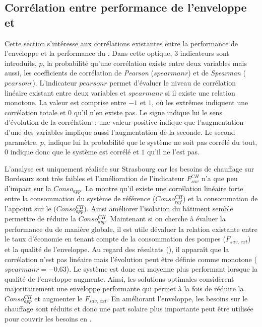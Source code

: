 \subsection{Corrélation entre performance de l’enveloppe et } %
\label{sub:correlation_entre_performance_de_l_enveloppe_et_ssc}
Cette section s’intéresse aux corrélations existantes entre la performance de l’enveloppe
et la performance du . Dans cette optique, $3$ indicateurs sont introduits, $p$,
la probabilité qu’une corrélation existe entre deux variables mais aussi, les coefficients
de corrélation de \textit{Pearson} ($spearmanr$) et de \textit{Spearman} ($pearsonr$).
L’indicateur $pearsonr$ permet d’évaluer le niveau de corrélation linéaire existant entre
deux variables et $spearmanr$ si il existe une relation monotone. La valeur est comprise
entre $-1$ et $1$, où les extrêmes indiquent une corrélation totale et $0$ qu’il n’en
existe pas. Le signe indique lui le sens d’évolution de la corrélation~: une valeur
positive indique que l’augmentation d’une des variables implique aussi l’augmentation de
la seconde. Le second paramètre, $p$, indique lui la probabilité que le système ne soit
pas corrélé du tout, $0$ indique donc que le système est corrélé et $1$ qu’il ne l’est
pas.

L’analyse est uniquement réalisée sur Strasbourg car les besoins de chauffage sur Bordeaux
sont très faibles et l’amélioration de l’indicateur $F_{sav}^{CH}$ n’a que peu d’impact sur
la $Conso_{app}$. La  montre qu’il existe une corrélation linéaire forte entre la
consommation du système de référence ($Conso_{ref}^{CH}$) et la consommation de l’appoint sur
le  ($Conso_{app}^{CH}$). Ainsi améliorer l’isolation du bâtiment semble permettre
de réduire la $Conso_{app}^{CH}$. Maintenant si on cherche à évaluer la performance du
 de manière globale, il est utile dévaluer la relation existante entre
le taux d’économie en tenant compte de la consommation des pompes ($F_{sav,\,ext}$)
et la qualité de l’enveloppe. Au regard des résultats (),
il apparaît que la corrélation n’est pas linéaire mais l’évolution peut être définie
comme monotone ($spearmanr = \num{-0.63}$). Le système est donc en moyenne plus performant
lorsque la qualité de l’enveloppe augmente. Ainsi, les solutions optimales
considèrent majoritairement une enveloppe performante qui permet à la fois de réduire
la $Conso_{app}^{CH}$ et augmenter le $F_{sav,\,ext}$. En améliorant l’enveloppe, les besoins
sur le chauffage sont réduits et donc une part solaire plus importante peut être
utilisée pour couvrir les besoins en .

